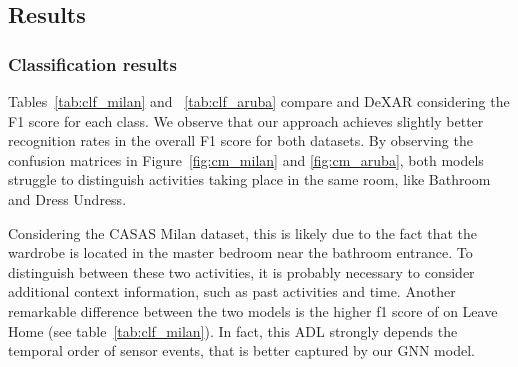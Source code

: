 


\subsection{Results}

\subsubsection{Classification results}

Tables~\ref{tab:clf_milan} and ~\ref{tab:clf_aruba} compare \acronym{} and DeXAR considering the F1 score for each class.
We observe that our approach achieves slightly better recognition rates in the overall F1 score for both datasets.
By observing the confusion matrices in Figure~\ref{fig:cm_milan} and \ref{fig:cm_aruba}, both models struggle to distinguish activities taking place in the same room, like Bathroom and Dress Undress. 

Considering the CASAS Milan dataset, this is likely due to the fact that the wardrobe is located in the master bedroom near the bathroom entrance. To distinguish between these two activities, it is probably necessary to consider additional context information, such as past activities and time. Another remarkable difference between the two models is the higher f1 score of \acronym{} on Leave Home (see table~\ref{tab:clf_milan}). In fact, this ADL strongly depends the temporal order of sensor events, that is better captured by our GNN model.




